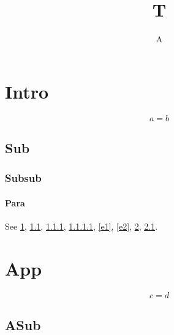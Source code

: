 \documentclass[aps,prb]{revtex4-2}
\begin{document}
\title{T}\author{A}\maketitle
\section{Intro}\label{s1}
\begin{equation}a=b\label{e1}\end{equation}
\subsection{Sub}\label{s11}
\subsubsection{Subsub}\label{s111}
\paragraph{Para}\label{p1}
See \ref{s1}, \ref{s11}, \ref{s111}, \ref{p1}, \ref{e1}, \ref{e2}, \ref{a1}, \ref{a11}.
\appendix
\section{App}\label{a1}
\begin{equation}c=d\label{e2}\end{equation}
\subsection{ASub}\label{a11}
\end{document}
